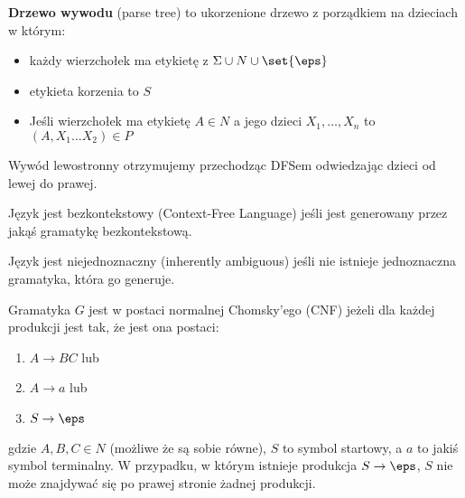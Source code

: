 \begin{definition}
	\textbf{Drzewo wywodu} (parse tree) to ukorzenione drzewo z porządkiem na dzieciach w którym:
	\begin{itemize}
		\item każdy wierzchołek ma etykietę z \( \Sigma \cup N \cup \set{\eps} \)
		\item etykieta korzenia to \( S \)
		\item Jeśli wierzchołek ma etykietę \( A \in N \) a jego dzieci \( X_1, \dots, X_n \) to \( (A, X_1\dots X_2) \in P \)
	\end{itemize}
\end{definition}
Wywód lewostronny otrzymujemy przechodząc DFSem odwiedzając dzieci od lewej do prawej.

\begin{definition}
	Język jest bezkontekstowy (Context-Free Language) jeśli jest generowany przez jakąś gramatykę bezkontekstową.
\end{definition}
\begin{definition}
	Język jest niejednoznaczny (inherently ambiguous) jeśli nie istnieje jednoznaczna gramatyka, która go generuje.
\end{definition}
\begin{definition}
	Gramatyka $G$ jest w postaci normalnej Chomsky'ego (CNF) jeżeli dla każdej produkcji jest tak, że jest ona postaci:

	\begin{enumerate}
		\item \(A \rightarrow BC\) lub
		\item \(A \rightarrow a\) lub
		\item \(S \rightarrow \eps\)
	\end{enumerate}

	gdzie \(A,B,C \in N\) (możliwe że są sobie równe), \(S\) to symbol startowy, a \(a\) to jakiś symbol terminalny. W przypadku, w którym istnieje produkcja \(S \rightarrow \eps\), \(S\) nie może znajdywać się po prawej stronie żadnej produkcji.
\end{definition}
